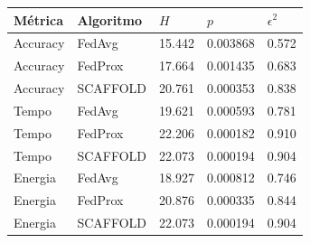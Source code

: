 \begin{tabular}{lllll}
\toprule
Métrica & Algoritmo & $H$ & $p$ & $\epsilon^2$ \\
\midrule
Accuracy & FedAvg & 15.442 & 0.003868 & 0.572 \\
Accuracy & FedProx & 17.664 & 0.001435 & 0.683 \\
Accuracy & SCAFFOLD & 20.761 & 0.000353 & 0.838 \\
Tempo & FedAvg & 19.621 & 0.000593 & 0.781 \\
Tempo & FedProx & 22.206 & 0.000182 & 0.910 \\
Tempo & SCAFFOLD & 22.073 & 0.000194 & 0.904 \\
Energia & FedAvg & 18.927 & 0.000812 & 0.746 \\
Energia & FedProx & 20.876 & 0.000335 & 0.844 \\
Energia & SCAFFOLD & 22.073 & 0.000194 & 0.904 \\
\bottomrule
\end{tabular}
